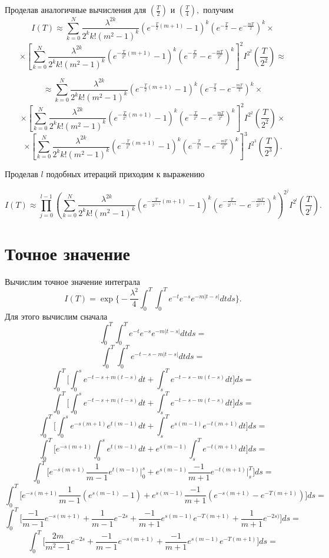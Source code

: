 \documentclass [a4paper, 12pt]{report}
\begin{document}
\noindent Проделав аналогичные вычисления для $(\frac{T}{2})$
и $(\frac{T}{4}),$ получим
$$
I(T)\approx \sum_{k=0}^{N} \frac{\lambda^{2k}} {2^k k! (m^2 - 1)^k}
(e^{-\frac{T}{2}(m+1)} - 1)^k (e^{-\frac{T}{2}} - e^{-\frac{mT}{2}})^k \times
$$
$$
\times[ \sum_{k=0}^{N} \frac{\lambda^{2k}} {2^k k! (m^2 - 1)^k}
(e^{-\frac{T}{2^2}(m+1)} - 1)^k (e^{-\frac{T}{2^2}} - e^{-\frac{mT}{2^2}})^k
]^2 I^{2^2}(\frac{T}{2^2}) \approx
$$

$$
 \approx \sum_{k=0}^{N} \frac{\lambda^{2k}} {2^k k! (m^2 - 1)^k}
(e^{-\frac{T}{2}(m+1)} - 1)^k (e^{-\frac{T}{2}} - e^{-\frac{mT}{2}})^k \times
$$
$$
\times[ \sum_{k=0}^{N} \frac{\lambda^{2k}} {2^k k! (m^2 - 1)^k}
(e^{-\frac{T}{2^2}(m+1)} - 1)^k (e^{-\frac{T}{2^2}} - e^{-\frac{mT}{2^2}})^k
]^2 I^{2^2}(\frac{T}{2^2}) \times
$$
$$
\times [ \sum_{k=0}^{N} \frac{\lambda^{2k}} {2^k k! (m^2 - 1)^k}
(e^{-\frac{T}{2^3}(m+1)} - 1)^k (e^{-\frac{T}{2^3}} - e^{-\frac{mT}{2^3}})^k
]^3 I^{2^3}(\frac{T}{2^3}).
$$

\vspace{1cm}

\noindent Проделав $l$ подобных итераций приходим к выражению

\begin{equation}\label{eq:5}
I(T)\approx \prod_{j=0}^{l-1}(
\sum_{k=0}^{N}\frac{\lambda^{2k}}{2^k k!(m^2 - 1)^{k}}
(e^{-\frac{T}{2^{j+1}}(m+1)} - 1)^k
(e^{-\frac{T}{2^{j+1}}} - e^{-\frac{mT}{2^{j+1}}})^k
)^{2^j} I^{2^l}(\frac{T}{2^l}).
\end{equation}

\section{Точное значение}

Вычислим точное значение интеграла
$$
I(T) = \exp\Big\{-\frac{\lambda^2}{4}
\int_{0}^{T}\int_{0}^{T} e^{-t} e^{-s} e^{-m|t-s|}dtds\Big\}.
$$
Для этого вычислим сначала
$$
\int_{0}^{T}\int_{0}^{T} e^{-t} e^{-s} e^{-m|t-s|}dtds =
$$
$$
\int_{0}^{T}\int_{0}^{T} e^{-t -s -m|t-s|}dtds =
$$
$$
\int_{0}^{T} \Big[
\int_{0}^{s} e^{-t -s + m(t-s)}dt + \int_{s}^{T} e^{-t -s -m(t-s)}dt
\Big ]ds =
$$
$$
\int_{0}^{T} \Big[
\int_{0}^{s} e^{-t -s + m(t-s)}dt + \int_{s}^{T} e^{-t -s -m(t-s)}dt
\Big ]ds =
$$
$$
\int_{0}^{T} \Big[
\int_{0}^{s} e^{-s(m+1)} e^{t(m-1)} dt + \int_{s}^{T} e^{s(m-1)} e^{-t(m+1)} dt
\Big ]ds =
$$
$$
\int_{0}^{T} \Big[
e^{-s(m+1)} \int_{0}^{s} e^{t(m-1)} dt +  e^{s(m-1)} \int_{s}^{T} e^{-t(m+1)} dt
\Big ]ds =
$$
$$
\int_{0}^{T} \Big[
e^{-s(m+1)} \frac{1}{m-1} e^{t(m-1)} \Big|_{0}^s +
e^{s(m-1)} \frac{-1}{m+1}e^{-t(m+1)} \Big|_{s}^{T}
\Big ]ds =
$$
$$
\int_{0}^{T} \Big[
e^{-s(m+1)} \frac{1}{m-1} (e^{s(m-1)} - 1) +
e^{s(m-1)} \frac{-1}{m+1} (e^{-s(m+1)} - e^{-T(m+1)})
\Big ]ds =
$$
$$
\int_{0}^{T} \Big[
\frac{-1}{m-1} e^{-s(m+1)} + \frac{1}{m-1} e^{-2s} +
\frac{-1}{m+1} e^{s(m-1)} e^{-T(m+1)} + \frac{1}{m+1} e^{-2s)}
\Big ]ds =
$$
$$
\int_{0}^{T} \Big[
\frac{2m}{m^2-1} e^{-2s} +\frac{-1}{m-1} e^{-s(m+1)} +
\frac{-1}{m+1} e^{s(m-1)} e^{-T(m+1)}
\Big ]ds =
$$
\end{document}
